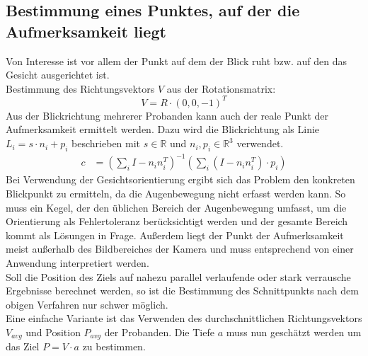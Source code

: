 \subsection{Bestimmung eines Punktes, auf der die Aufmerksamkeit liegt}
Von Interesse ist vor allem der Punkt auf dem der Blick ruht bzw. auf den das Gesicht ausgerichtet ist.\\
Bestimmung des Richtungsvektors $V$ aus der Rotationsmatrix:
\[V= R\cdot (0,0,-1)^T\] 
Aus der Blickrichtung mehrerer Probanden kann auch der reale Punkt der Aufmerksamkeit ermittelt werden. Dazu wird die Blickrichtung als Linie $L_i = s \cdot n_i+ p_i$ beschrieben mit $s\in \mathbb{R}$ und $n_i,p_i \in \mathbb{R}^3$ verwendet.
\begin{align*}
c&=(\sum_{i} I -n_in_i^T)^{-1}
(\sum_{i} (I -n_in_i^T)\cdot p_i)
\end{align*}
Bei Verwendung der Gesichtsorientierung ergibt sich das Problem den konkreten Blickpunkt zu ermitteln, da die Augenbewegung nicht erfasst werden kann.
So muss ein Kegel, der den üblichen Bereich der Augenbewegung umfasst, um die Orientierung als Fehlertoleranz berücksichtigt werden und der gesamte Bereich kommt als Lösungen in Frage.
Außerdem liegt der Punkt der Aufmerksamkeit meist außerhalb des Bildbereiches der Kamera und muss entsprechend von einer Anwendung interpretiert werden.\\
Soll die Position des Ziels auf nahezu parallel verlaufende oder stark verrausche Ergebnisse berechnet werden, so ist die Bestimmung des Schnittpunkts nach dem obigen Verfahren nur schwer möglich.\\
Eine einfache Variante ist das Verwenden des durchschnittlichen Richtungsvektors $V_{avg}$ und Position $P_{avg}$ der Probanden. Die Tiefe $a$ muss nun geschätzt werden um das Ziel $P=V\cdot a$ zu bestimmen.